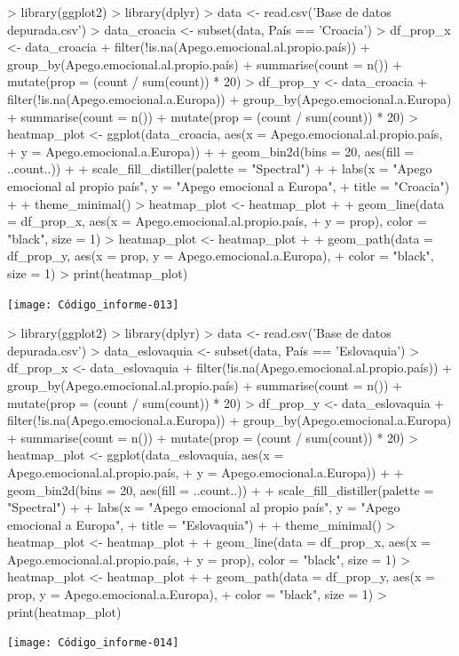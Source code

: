 \documentclass{article}
\begin{document}
\newpage
\begin{Schunk}
\begin{Sinput}
> library(ggplot2)
> library(dplyr)
> data <- read.csv('Base de datos depurada.csv')
> data_croacia <- subset(data, País == 'Croacia')
> df_prop_x <- data_croacia %
+   filter(!is.na(Apego.emocional.al.propio.país)) %
+   group_by(Apego.emocional.al.propio.país) %
+   summarise(count = n()) %
+   mutate(prop = (count / sum(count)) * 20)
> df_prop_y <- data_croacia %
+   filter(!is.na(Apego.emocional.a.Europa)) %
+   group_by(Apego.emocional.a.Europa) %
+   summarise(count = n()) %
+   mutate(prop = (count / sum(count)) * 20)
> heatmap_plot <- ggplot(data_croacia, aes(x = Apego.emocional.al.propio.país,
+                                  y = Apego.emocional.a.Europa)) +
+   geom_bin2d(bins = 20, aes(fill = ..count..)) +
+   scale_fill_distiller(palette = "Spectral") +
+   labs(x = "Apego emocional al propio país", y = "Apego emocional a Europa",
+        title = "Croacia") +
+   theme_minimal()
> heatmap_plot <- heatmap_plot +
+   geom_line(data = df_prop_x, aes(x = Apego.emocional.al.propio.país,
+                                   y = prop), color = "black", size = 1)
> heatmap_plot <- heatmap_plot +
+   geom_path(data = df_prop_y, aes(x = prop, y = Apego.emocional.a.Europa),
+             color = "black", size = 1)
> print(heatmap_plot)
\end{Sinput}
\end{Schunk}
\texttt{[image: Código\_informe-013]}

\newpage
\begin{Schunk}
\begin{Sinput}
> library(ggplot2)
> library(dplyr)
> data <- read.csv('Base de datos depurada.csv')
> data_eslovaquia <- subset(data, País == 'Eslovaquia')
> df_prop_x <- data_eslovaquia %
+   filter(!is.na(Apego.emocional.al.propio.país)) %
+   group_by(Apego.emocional.al.propio.país) %
+   summarise(count = n()) %
+   mutate(prop = (count / sum(count)) * 20)
> df_prop_y <- data_eslovaquia %
+   filter(!is.na(Apego.emocional.a.Europa)) %
+   group_by(Apego.emocional.a.Europa) %
+   summarise(count = n()) %
+   mutate(prop = (count / sum(count)) * 20)
> heatmap_plot <- ggplot(data_eslovaquia, aes(x = Apego.emocional.al.propio.país,
+                                  y = Apego.emocional.a.Europa)) +
+   geom_bin2d(bins = 20, aes(fill = ..count..)) +
+   scale_fill_distiller(palette = "Spectral") +
+   labs(x = "Apego emocional al propio país", y = "Apego emocional a Europa",
+        title = "Eslovaquia") +
+   theme_minimal()
> heatmap_plot <- heatmap_plot +
+   geom_line(data = df_prop_x, aes(x = Apego.emocional.al.propio.país,
+                                   y = prop), color = "black", size = 1)
> heatmap_plot <- heatmap_plot +
+   geom_path(data = df_prop_y, aes(x = prop, y = Apego.emocional.a.Europa),
+             color = "black", size = 1)
> print(heatmap_plot)
\end{Sinput}
\end{Schunk}
\texttt{[image: Código\_informe-014]}
\end{document}
